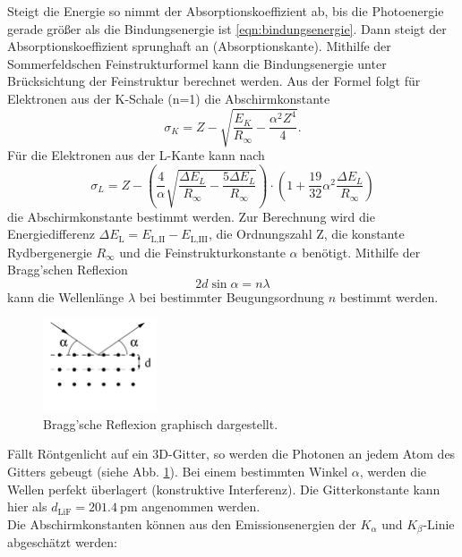 Steigt die Energie so nimmt der Absorptionskoeffizient ab, bis die Photoenergie gerade größer als die Bindungsenergie ist \eqref{eqn:bindungsenergie}.
Dann steigt der Absorptionskoeffizient sprunghaft an (Absorptionskante).
Mithilfe der Sommerfeldschen Feinstrukturformel kann die Bindungsenergie unter Brücksichtung der Feinstruktur berechnet werden.
Aus der Formel folgt für Elektronen aus der K-Schale (n=1) die Abschirmkonstante
\begin{equation}
    \sigma_K = Z - \sqrt{\frac{E_K}{R_\infty} - \frac{\alpha^2 Z^4}{4}} .
    \label{eqn:abschirm_k}
\end{equation}
Für die Elektronen aus der L-Kante kann nach
\begin{equation}
    \sigma_L = Z - \left( \frac{4}{\alpha}\sqrt{\frac{\Delta E_L}{R_\infty} - \frac{5 \Delta E_L}{R_\infty}} \right) \cdot \left (1 + \frac{19}{32}\alpha^2 \frac{\Delta E_L}{R_\infty}  \right)
    \label{eqn:abschirm_l}
\end{equation}
die Abschirmkonstante bestimmt werden.
Zur Berechnung wird die Energiedifferenz $\Delta E_\text{L} = E_\text{L,II} - E_\text{L,III}$, die Ordnungszahl Z, die konstante Rydbergenergie $R_\infty$ und die Feinstrukturkonstante $\alpha$ benötigt.
Mithilfe der Bragg'schen Reflexion 
\begin{equation}
    2 d \sin \alpha = n \lambda
    \label{eqn:lambdaalpha}
\end{equation}
kann die Wellenlänge $\lambda$ bei bestimmter Beugungsordnung $n$ bestimmt werden.
\begin{figure}
    \centering
    \includegraphics[width=0.3\textwidth]{content/data/kristall.jpg}
    \caption{Bragg'sche Reflexion graphisch dargestellt. \cite[3]{anleitung}}
    \label{fig:bragg}
\end{figure}
Fällt Röntgenlicht auf ein 3D-Gitter, so werden die Photonen an jedem Atom des Gitters gebeugt (siehe Abb. \ref{fig:bragg}).
Bei einem bestimmten Winkel $\alpha$, werden die Wellen perfekt überlagert (konstruktive Interferenz).
Die Gitterkonstante kann hier als $d_\text{LiF}=\SI{201.4}{\pico\metre}$ angenommen werden.
\\
Die Abschirmkonstanten können aus den Emissionsenergien der $K_\alpha$ und $K_\beta$-Linie abgeschätzt werden:
